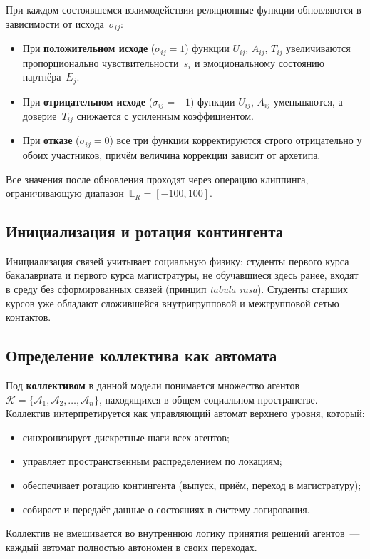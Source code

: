 \documentclass[12pt]{article}
\begin{document}
При каждом состоявшемся взаимодействии реляционные функции обновляются в зависимости от исхода~$\sigma_{ij}$:
\begin{itemize}
    \item При \textbf{положительном исходе} ($\sigma_{ij}=1$) функции $U_{ij}$, $A_{ij}$, $T_{ij}$ увеличиваются пропорционально чувствительности~$s_i$ и эмоциональному состоянию партнёра~$E_j$.
    \item При \textbf{отрицательном исходе} ($\sigma_{ij}=-1$) функции $U_{ij}$, $A_{ij}$ уменьшаются, а доверие~$T_{ij}$ снижается с усиленным коэффициентом.
    \item При \textbf{отказе} ($\sigma_{ij}=0$) все три функции корректируются строго отрицательно у обоих участников, причём величина коррекции зависит от архетипа.
\end{itemize}

Все значения после обновления проходят через операцию клиппинга, ограничивающую диапазон~$\mathbb{E}_R = [-100, 100]$.



\subsection{Инициализация и ротация контингента}

Инициализация связей учитывает социальную физику: студенты первого курса бакалавриата и первого курса магистратуры, не обучавшиеся здесь ранее, входят в среду без сформированных связей (принцип \textit{tabula rasa}). Студенты старших курсов уже обладают сложившейся внутригрупповой и межгрупповой сетью контактов.

\subsection{Определение коллектива как автомата}

Под \textbf{коллективом} в данной модели понимается множество агентов $\mathcal{K} = \{\mathcal{A}_1, \mathcal{A}_2, \ldots, \mathcal{A}_n\}$, находящихся в общем социальном пространстве. Коллектив интерпретируется как управляющий автомат верхнего уровня, который:
\begin{itemize}
    \item синхронизирует дискретные шаги всех агентов;
    \item управляет пространственным распределением по локациям;
    \item обеспечивает ротацию контингента (выпуск, приём, переход в магистратуру);
    \item собирает и передаёт данные о состояниях в систему логирования.
\end{itemize}
Коллектив не вмешивается во внутреннюю логику принятия решений агентов~--- каждый автомат полностью автономен в своих переходах.
\end{document}
